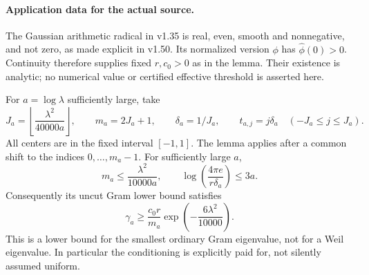 \paragraph{Application data for the actual source.}
The Gaussian arithmetic radical in v1.35 is real, even, smooth and
nonnegative, and not zero, as made explicit in v1.50. Its normalized
version $\phi$ has $\widehat\phi(0)>0$. Continuity therefore supplies
fixed $r,c_0>0$ as in the lemma. Their existence is analytic; no numerical
value or certified effective threshold is asserted here.

For $a=\log\lambda$ sufficiently large, take
\[
 J_a=\left\lfloor\frac{\lambda^2}{40000a}\right\rfloor,
 \qquad m_a=2J_a+1,\qquad \delta_a=1/J_a,
 \qquad t_{a,j}=j\delta_a\quad(-J_a\le j\le J_a).
\]
All centers are in the fixed interval $[-1,1]$.
The lemma applies after a common shift to the indices $0,\ldots,m_a-1$.
For sufficiently large $a$,
\[
 m_a\le\frac{\lambda^2}{10000a},\qquad
 \log\left(\frac{4\pi e}{r\delta_a}\right)\le3a.
\]
Consequently its uncut Gram lower bound satisfies
\begin{equation}\label{eq:ns46-gram-asymptotic}
 \gamma_a\ge\frac{c_0r}{m_a}
       \exp\left(-\frac{6\lambda^2}{10000}\right).
\end{equation}
This is a lower bound for the smallest ordinary Gram eigenvalue,
not for a Weil eigenvalue. In particular the conditioning is explicitly
paid for, not silently assumed uniform.
